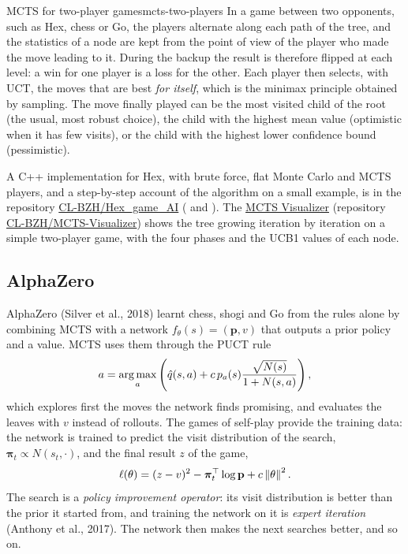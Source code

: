 \begin{remark}{MCTS for two-player games}{mcts-two-players}
  In a game between two opponents, such as Hex, chess or Go, the players
  alternate along each path of the tree, and the statistics of a node are
  kept from the point of view of the player who made the move leading to
  it. During the backup the result is therefore flipped at each level: a
  win for one player is a loss for the other. Each player then selects,
  with UCT, the moves that are best \emph{for itself}, which is the minimax
  principle obtained by sampling. The move finally played can be the most
  visited child of the root (the usual, most robust choice), the child with
  the highest mean value (optimistic when it has few visits), or the child
  with the highest lower confidence bound (pessimistic).

  A C++ implementation for Hex, with brute force, flat Monte Carlo and MCTS
  players, and a step-by-step account of the algorithm on a small example,
  is in the repository
  \href{https://github.com/CL-BZH/Hex_game_AI}{CL-BZH/Hex\_game\_AI}
  ( and ). The
  \href{https://CL-BZH.github.io/MCTS-Visualizer/}{MCTS Visualizer}
  (repository
  \href{https://github.com/CL-BZH/MCTS-Visualizer}{CL-BZH/MCTS-Visualizer})
  shows the tree growing iteration by iteration on a simple two-player game,
  with the four phases and the UCB1 values of each node.
\end{remark}

\subsection{AlphaZero}

AlphaZero (Silver et al., 2018) learnt chess, shogi and Go from the rules
alone by combining MCTS with a network $f_\theta(s) = (\mathbf{p}, v)$ that
outputs a prior policy and a value. MCTS uses them through the PUCT rule
\begin{equation}
  a = \operatorname*{arg\,max}_a \left( \hat q(s, a) + c\, p_a(s) \frac{\sqrt{N(s)}}{1 +
  N(s, a)} \right),
\end{equation}
which explores first the moves the network finds promising, and evaluates
the leaves with $v$ instead of rollouts. The games of self-play provide the
training data: the network is trained to predict the visit distribution of
the search, $\boldsymbol{\pi}_t \propto N(s_t, \cdot)$, and the final
result $z$ of the game,
\begin{equation}
  \ell(\theta) = (z - v)^2 - \boldsymbol{\pi}_t^\top \log \mathbf{p} + c
  \left\lVert \theta \right\rVert^2.
\end{equation}
The search is a \emph{policy improvement operator}: its visit distribution
is better than the prior it started from, and training the network on it
is \emph{expert iteration} (Anthony et al., 2017). The network then makes
the next searches better, and so on.

